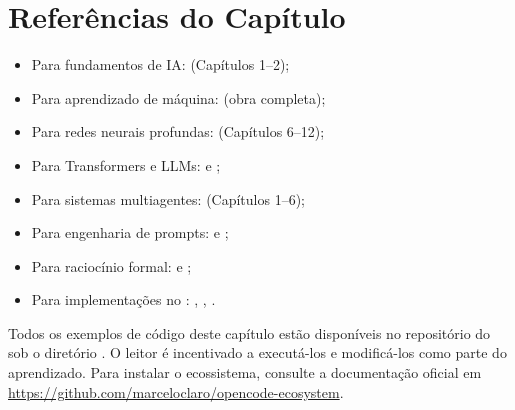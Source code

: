 \section*{Referências do Capítulo}
\begin{itemize}
\item Para fundamentos de IA: \cite{russell2020inteligencia}
(Capítulos 1--2);
\item Para aprendizado de máquina: \cite{hastie2009elements}
(obra completa);
\item Para redes neurais profundas: \cite{goodfellow2016deep}
(Capítulos 6--12);
\item Para Transformers e LLMs: \cite{vaswani2017attention}
e \cite{brown2020language};
\item Para sistemas multiagentes: \cite{wooldridge2009multiagent}
(Capítulos 1--6);
\item Para engenharia de prompts: \cite{white2023prompt}
e \cite{wei2022chain};
\item Para raciocínio formal: \cite{demoura2008z3}
e \cite{byrd2012mini};
\item Para implementações no \opencodeeco{}: \cite{opencode2026ecosystem},
\cite{opencode2026spec036}, \cite{opencode2026spec038}.
\end{itemize}
\begin{observacao}
Todos os exemplos de código deste capítulo estão disponíveis no repositório
do \opencodeeco{} sob o diretório . O leitor é
incentivado a executá-los e modificá-los como parte do aprendizado.
Para instalar o ecossistema, consulte a documentação oficial em
\url{https://github.com/marceloclaro/opencode-ecosystem}.
\end{observacao}
